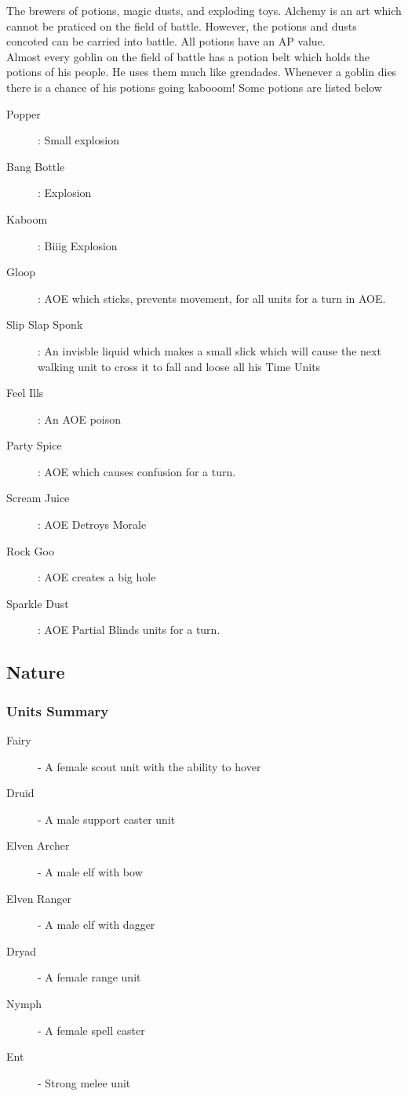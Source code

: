 \documentclass[a4paper,twocolumn]{article}
\begin{document}
The brewers of potions, magic dusts, and exploding toys. Alchemy is an art which cannot be praticed on the field of battle. However, the potions and dusts concoted can be carried into battle. All potions have an AP value.\\
Almost every goblin on the field of battle has a potion belt which holds the potions of his people. He uses them much like grendades. Whenever a goblin dies there is a chance of his potions going kabooom! Some potions are listed below
\begin{description}
\item[Popper]: Small explosion
\item[Bang Bottle]: Explosion
\item[Kaboom]: Biiig Explosion
\item[Gloop]: AOE which sticks, prevents movement, for all units for a turn in AOE.
\item[Slip Slap Sponk]: An invisble liquid which makes a small slick which will cause the next walking unit to cross it to fall and loose all his Time Units
\item[Feel Ills]: An AOE poison
\item[Party Spice]: AOE which causes confusion for a turn.
\item[Scream Juice]: AOE Detroys Morale
\item[Rock Goo]: AOE creates a big hole
\item[Sparkle Dust]: AOE Partial Blinds units for a turn.
\end{description}
 
\subsection{Nature}

\subsubsection{Units Summary}
\begin{description}
\item[Fairy] - A female scout unit with the ability to hover
\item[Druid] - A male support caster unit

\item[Elven Archer] - A male elf with bow

\item[Elven Ranger] - A male elf with dagger
\item[Dryad] - A female range unit 

\item[Nymph] - A female spell caster
\item[Ent] - Strong melee unit
\end{description}
\end{document}
